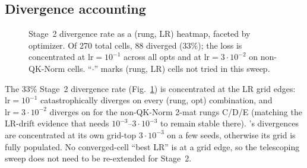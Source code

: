 \subsection{Divergence accounting}

\begin{figure}[h]
\centering
{}
\caption{Stage~2 divergence rate as a (rung, LR) heatmap, faceted by optimizer. Of 270 total cells, 88 diverged (33\%); the loss is concentrated at $\mathrm{lr}=10^{-1}$ across all opts and at $\mathrm{lr}=3\!\cdot\!10^{-2}$ on non-QK-Norm \optCoupled{} cells. ``$\cdot$'' marks (rung, LR) cells not tried in this sweep.}\label{fig:stage2-divergence}
\end{figure}

The 33\% Stage~2 divergence rate (Fig.~\ref{fig:stage2-divergence}) is concentrated at the LR grid edges: $\mathrm{lr}{=}10^{-1}$ catastrophically diverges on every (rung, opt) combination, and $\mathrm{lr}{=}3\!\cdot\!10^{-2}$ diverges on \optCoupled{} for the non-QK-Norm 2-mat rungs C/D/E (matching the LR-drift evidence that \optCoupled{} needs $10^{-3}$--$3\!\cdot\!10^{-3}$ to remain stable there). \optAdamW{}'s divergences are concentrated at its own grid-top $3\!\cdot\!10^{-3}$ on a few seeds, otherwise its grid is fully populated. No converged-cell ``best LR'' is at a grid edge, so the telescoping sweep does not need to be re-extended for Stage~2.
